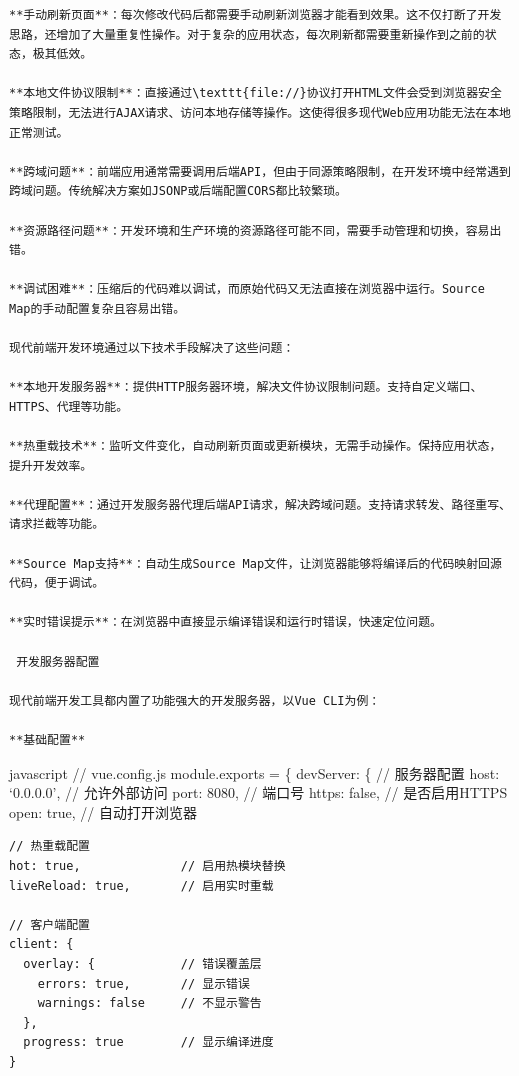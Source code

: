 {{\begin{lstlisting}
**手动刷新页面**：每次修改代码后都需要手动刷新浏览器才能看到效果。这不仅打断了开发思路，还增加了大量重复性操作。对于复杂的应用状态，每次刷新都需要重新操作到之前的状态，极其低效。

**本地文件协议限制**：直接通过\texttt{file://}协议打开HTML文件会受到浏览器安全策略限制，无法进行AJAX请求、访问本地存储等操作。这使得很多现代Web应用功能无法在本地正常测试。

**跨域问题**：前端应用通常需要调用后端API，但由于同源策略限制，在开发环境中经常遇到跨域问题。传统解决方案如JSONP或后端配置CORS都比较繁琐。

**资源路径问题**：开发环境和生产环境的资源路径可能不同，需要手动管理和切换，容易出错。

**调试困难**：压缩后的代码难以调试，而原始代码又无法直接在浏览器中运行。Source Map的手动配置复杂且容易出错。

现代前端开发环境通过以下技术手段解决了这些问题：

**本地开发服务器**：提供HTTP服务器环境，解决文件协议限制问题。支持自定义端口、HTTPS、代理等功能。

**热重载技术**：监听文件变化，自动刷新页面或更新模块，无需手动操作。保持应用状态，提升开发效率。

**代理配置**：通过开发服务器代理后端API请求，解决跨域问题。支持请求转发、路径重写、请求拦截等功能。

**Source Map支持**：自动生成Source Map文件，让浏览器能够将编译后的代码映射回源代码，便于调试。

**实时错误提示**：在浏览器中直接显示编译错误和运行时错误，快速定位问题。

 开发服务器配置

现代前端开发工具都内置了功能强大的开发服务器，以Vue CLI为例：

**基础配置**
\end{lstlisting}

javascript // vue.config.js module.exports = \{ devServer: \{ // 服务器配置 host: `0.0.0.0', // 允许外部访问 port: 8080, // 端口号 https: false, // 是否启用HTTPS open: true, // 自动打开浏览器

\begin{verbatim}
// 热重载配置
hot: true,              // 启用热模块替换
liveReload: true,       // 启用实时重载

// 客户端配置
client: {
  overlay: {            // 错误覆盖层
    errors: true,       // 显示错误
    warnings: false     // 不显示警告
  },
  progress: true        // 显示编译进度
}
\end{verbatim}

}}
